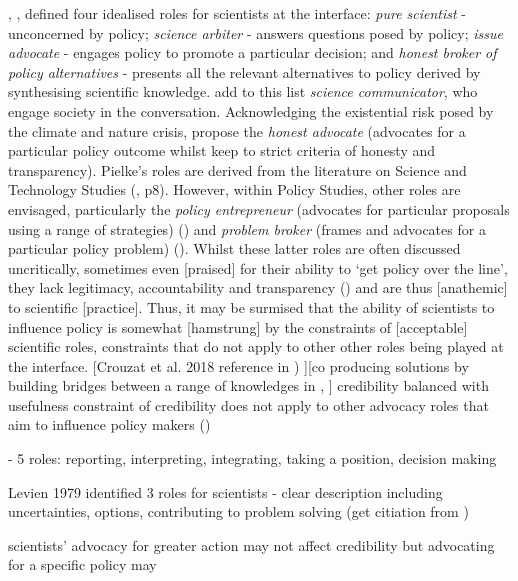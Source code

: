 , \textcite{Pielke2007}, defined four idealised roles for scientists at the interface: \emph{pure scientist} - unconcerned by policy; \emph{science arbiter} - answers questions posed by policy; \emph{issue advocate} - engages policy to promote a particular decision; and \emph{honest broker of policy alternatives} - presents all the relevant alternatives to policy derived by synthesising scientific knowledge. \textcite{RapleyD2014} add to this list \emph{science communicator}, who engage society in the conversation. Acknowledging the existential risk posed by the climate and nature crisis, \textcite{GregoryBW2024} propose the \emph{honest advocate} (advocates for a particular policy outcome whilst keep to strict criteria of honesty and transparency).  Pielke's roles are derived from the literature on Science and Technology Studies (\cite{Pielke2007}, p8). However, within Policy Studies, other roles are envisaged, particularly the \emph{policy entrepreneur} (advocates for particular proposals using a range of strategies) (\cite{Kingdon1993,Cairney2018}) and \emph{problem broker} (frames and advocates for a particular policy problem) (\cite{Knaggard2015}). Whilst these latter roles are often discussed uncritically, sometimes even [praised] for their ability to `get policy over the line', they lack legitimacy, accountability and transparency (\cite{vonMalmborg2024strategies}) and are thus [anathemic] to scientific [practice]. Thus, it may be surmised that the ability of scientists to influence policy is somewhat [hamstrung] by the constraints of [acceptable] scientific roles, constraints that do not apply to other other roles being played at the interface. [Crouzat et al. 2018 reference in \cite{BalvaneraJNOBCDGGKKMPSSW2020}) ][co producing solutions by building bridges between a range of knowledges \cite{NorstromEtAl2020} in \cite{BalvaneraJNOBCDGGKKMPSSW2020}, \cite{MatukBSAHT2020}]
credibility balanced with usefulness \cite{WesselinkH2020}
constraint of credibility does not apply to other advocacy roles that aim to influence policy makers (\cite{Kingdon1993,Knaggard2015,Cairney2018,vonMalmborg2024strategies})

\cite{SteelLLS2004,SinghTKMMC2014} - 5 roles: reporting, interpreting, integrating, taking a position, decision making

Levien 1979 identified 3 roles for scientists - clear description including uncertainties, options, contributing to problem solving (get citiation from \cite{SteelLLS2004})

\cite{ColognaKMBMO2024} scientists' advocacy for greater action may not affect credibility but advocating for a specific policy may

